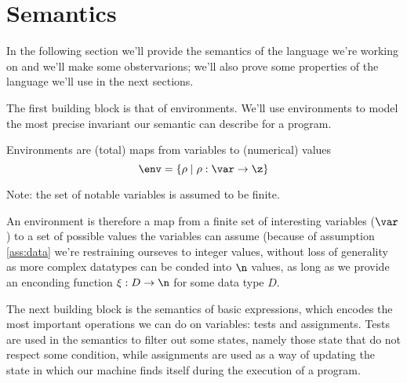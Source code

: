 \section{Semantics}

In the following section we'll provide the semantics of the language
we're working on and we'll make some obstervarions; we'll also prove
some properties of the language we'll use in the next sections.

The first building block is that of environments. We'll use
environments to model the most precise invariant our semantic can
describe for a program.

\begin{definition}[Environments]
  Environments are (total) maps from variables to (numerical)
  values \[\env = \{\rho \mid \rho : \var \to \z\}\]

  Note: the set of notable variables is assumed to be finite.
\end{definition}

An environment is therefore a map from a finite set of interesting
variables (\(\var\)) to a set of possible values the variables can
assume (because of assumption \ref{ass:data} we're restraining
ourseves to integer values, without loss of generality as more complex
datatypes can be conded into \(\n\) values, as long as we provide an
enconding function \(\xi : D \to \n\) for some data type \(D\).

The next building block is the semantics of basic expressions, which
encodes the most important operations we can do on variables: tests
and assignments. Tests are used in the semantics to filter out some
states, namely those state that do not respect some condition, while
assignments are used as a way of updating the state in which our
machine finds itself during the execution of a program.

